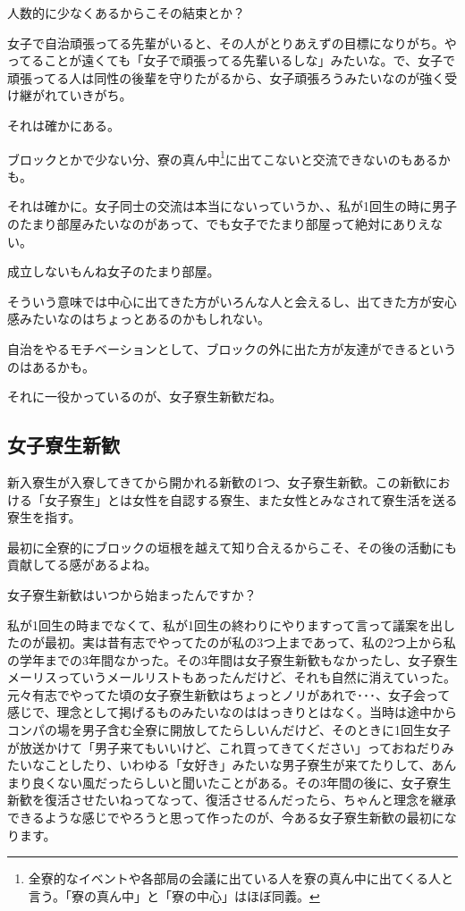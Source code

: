 \begin{multicols}{2}
  人数的に少なくあるからこその結束とか？

  女子で自治頑張ってる先輩がいると、その人がとりあえずの目標になりがち。やってることが遠くても「女子で頑張ってる先輩いるしな」みたいな。で、女子で頑張ってる人は同性の後輩を守りたがるから、女子頑張ろうみたいなのが強く受け継がれていきがち。

  それは確かにある。

  ブロックとかで少ない分、寮の真ん中\footnote{全寮的なイベントや各部局の会議に出ている人を寮の真ん中に出てくる人と言う。「寮の真ん中」と「寮の中心」はほぼ同義。}に出てこないと交流できないのもあるかも。

  それは確かに。女子同士の交流は本当にないっていうか、、私が1回生の時に男子のたまり部屋みたいなのがあって、でも女子でたまり部屋って絶対にありえない。

  成立しないもんね女子のたまり部屋。

  そういう意味では中心に出てきた方がいろんな人と会えるし、出てきた方が安心感みたいなのはちょっとあるのかもしれない。

  自治をやるモチベーションとして、ブロックの外に出た方が友達ができるというのはあるかも。

  それに一役かっているのが、女子寮生新歓だね。





  \subsection{女子寮生新歓}

  \noindent 新入寮生が入寮してきてから開かれる新歓の1つ、女子寮生新歓。この新歓における「女子寮生」とは女性を自認する寮生、また女性とみなされて寮生活を送る寮生を指す。
  \tatespace

  最初に全寮的にブロックの垣根を越えて知り合えるからこそ、その後の活動にも貢献してる感があるよね。



  女子寮生新歓はいつから始まったんですか？

  私が1回生の時までなくて、私が1回生の終わりにやりますって言って議案を出したのが最初。実は昔有志でやってたのが私の3つ上まであって、私の2つ上から私の学年までの3年間なかった。その3年間は女子寮生新歓もなかったし、女子寮生メーリスっていうメールリストもあったんだけど、それも自然に消えていった。元々有志でやってた頃の女子寮生新歓はちょっとノリがあれで･･･、女子会って感じで、理念として掲げるものみたいなのははっきりとはなく。当時は途中からコンパの場を男子含む全寮に開放してたらしいんだけど、そのときに1回生女子が放送かけて「男子来てもいいけど、これ買ってきてください」っておねだりみたいなことしたり、いわゆる「女好き」みたいな男子寮生が来てたりして、あんまり良くない風だったらしいと聞いたことがある。その3年間の後に、女子寮生新歓を復活させたいねってなって、復活させるんだったら、ちゃんと理念を継承できるような感じでやろうと思って作ったのが、今ある女子寮生新歓の最初になります。


\end{multicols}
